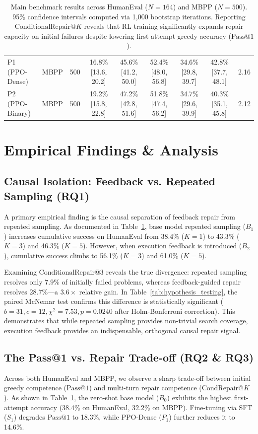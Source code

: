 \documentclass[letterpaper]{article} %
\begin{document}
\begin{table}[t]
\begin{tabular}{llccccccc}
P1 (PPO-Dense) & MBPP & 500 & 16.8\% [13.6, 20.2] & 45.6\% [41.2, 50.0] & 52.4\% [48.0, 56.8] & 34.6\% [29.8, 39.7] & 42.8\% [37.7, 48.1] & 2.16 \\
P2 (PPO-Binary) & MBPP & 500 & 19.2\% [15.8, 22.8] & 47.2\% [42.8, 51.6] & 51.8\% [47.4, 56.2] & 34.7\% [29.6, 39.9] & 40.3\% [35.1, 45.8] & 2.12 \\
\bottomrule
\end{tabular}
\caption{Main benchmark results across HumanEval ($N=164$) and MBPP ($N=500$). 95\% confidence intervals computed via 1,000 bootstrap iterations. Reporting $\text{ConditionalRepair}@K$ reveals that RL training significantly expands repair capacity on initial failures despite lowering first-attempt greedy accuracy ($\text{Pass@1}$).}
\label{tab:main_results}
\end{table}

\section{Empirical Findings \& Analysis}
\label{sec:results}

\subsection{Causal Isolation: Feedback vs. Repeated Sampling (RQ1)}
A primary empirical finding is the causal separation of feedback repair from repeated sampling. As documented in Table~\ref{tab:main_results}, base model repeated sampling ($B_1$) increases cumulative success on HumanEval from 38.4\% ($K=1$) to 43.3\% ($K=3$) and 46.3\% ($K=5$). However, when execution feedback is introduced ($B_2$), cumulative success climbs to 56.1\% ($K=3$) and 61.0\% ($K=5$). 

Examining $\text{ConditionalRepair}@3$ reveals the true divergence: repeated sampling resolves only 7.9\% of initially failed problems, whereas feedback-guided repair resolves 28.7\%---a $3.6\times$ relative gain. In Table~\ref{tab:hypothesis_testing}, the paired McNemar test confirms this difference is statistically significant ($b=31, c=12, \chi^2=7.53, p=0.0240$ after Holm-Bonferroni correction). This demonstrates that while repeated sampling provides non-trivial search coverage, execution feedback provides an indispensable, orthogonal causal repair signal.

\subsection{The Pass@1 vs. Repair Trade-off (RQ2 \& RQ3)}
Across both HumanEval and MBPP, we observe a sharp trade-off between initial greedy competence ($\text{Pass@1}$) and multi-turn repair competence ($\text{CondRepair}@K$). As shown in Table~\ref{tab:main_results}, the zero-shot base model ($B_0$) exhibits the highest first-attempt accuracy (38.4\% on HumanEval, 32.2\% on MBPP). Fine-tuning via SFT ($S_1$) degrades $\text{Pass@1}$ to 18.3\%, while PPO-Dense ($P_1$) further reduces it to 14.6\%.
\end{document}
